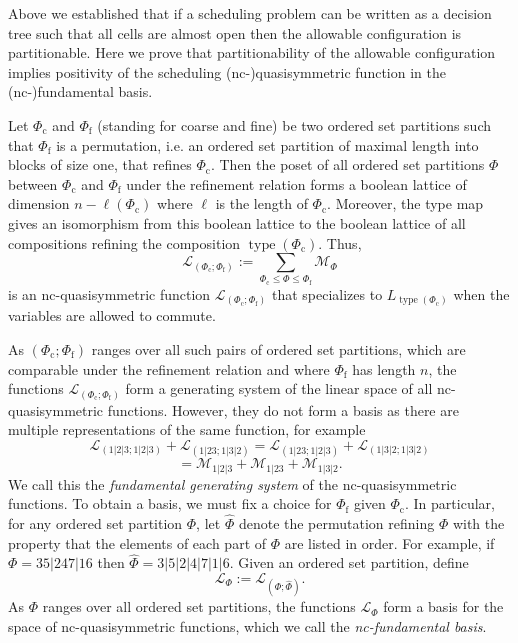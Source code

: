 \documentclass[12pt,reqno]{amsart}
\numberwithin{definition}{section}
\theoremstyle{definition}
\newcommand{\ncM}{\mathcal{M}}
\newcommand{\ncL}{\mathcal{L}}
\begin{document}
Above we established that if a scheduling problem can be written as a
 decision tree such that all cells are almost open then the allowable
configuration is partitionable.  Here we prove that partitionability
of the allowable configuration implies positivity of the scheduling
(nc-)quasisymmetric function in the (nc-)fundamental basis.



 Let $\Phi_\text{c}$ and $\Phi_\text{f}$ (standing for coarse and fine) be two ordered set partitions such that $\Phi_\text{f}$ is a permutation, i.e. an ordered set partition of maximal length into blocks of size one, that refines $\Phi_\text{c}$. Then the poset of all ordered set partitions $\Phi$  between $\Phi_\text{c}$ and $\Phi_\text{f}$ under the refinement relation forms a boolean lattice of dimension $n-\ell(\Phi_\text{c})$ where $\ell$ is the length of $\Phi_\text{c}$. Moreover, the type map gives an isomorphism from this boolean lattice to the boolean lattice of all compositions refining the composition $\operatorname{type}(\Phi_\text{c})$. Thus,
\[
  \ncL_{(\Phi_\text{c};\Phi_\text{f})} := \sum_{\Phi_\text{c}\leq \Phi \leq \Phi_\text{f}} \ncM_\Phi
\]
is an nc-quasisymmetric function $\ncL_{(\Phi_\text{c};\Phi_\text{f})}$ that specializes to $L_{\operatorname{type}(\Phi_\text{c})}$ when the variables are allowed to commute.

As $(\Phi_\text{c};\Phi_\text{f})$ ranges over all such pairs of ordered set partitions, which are comparable under the refinement relation and  where $\Phi_\text{f}$ has length $n$, the functions $\ncL_{(\Phi_\text{c};\Phi_\text{f})}$ form a generating system of the linear space of all nc-quasisymmetric functions. However, they do not form a basis as there are multiple representations of the same function, for example
\[
  \ncL_{(1|2|3;1|2|3)} + \ncL_{(1|23;1|3|2)} =   \ncL_{(1|23;1|2|3)} +  \ncL_{(1|3|2;1|3|2)}
\]
$$ = \ncM_{1|2|3} + \ncM_{1|23} + \ncM_{1|3|2}.$$
We call this the \emph{fundamental generating system} of the nc-quasisymmetric functions. To obtain a basis, we must fix a choice for $\Phi_\text{f}$ given $\Phi_\text{c}$.  In particular, for any ordered set partition $\Phi$, let $\hat{\Phi}$ denote the permutation refining $\Phi$ with the property that the elements of each part of $\Phi$ are listed in order. For example, if $\Phi=35|247|16$ then $\hat{\Phi}=3|5|2|4|7|1|6$. 
Given an ordered set partition, define
 $$\ncL_\Phi:=\ncL_{(\Phi;\hat{\Phi})}.$$ As $\Phi$ ranges over all ordered set partitions, the functions $\ncL_\Phi$ form a basis for the space of nc-quasisymmetric functions, which we call the \emph{nc-fundamental basis}.
\end{document}
